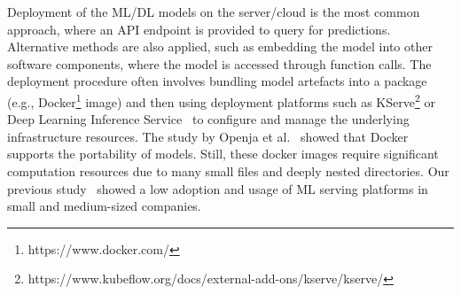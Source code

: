 
Deployment of the ML/DL models on the server/cloud is the most common approach, where an API endpoint is provided to query for predictions. Alternative methods are also applied, such as embedding the model into other software components, where the model is accessed through function calls. The deployment procedure often involves bundling model artefacts into a package (e.g., Docker\footnote{https://www.docker.com/} image) and then using deployment platforms such as KServe\footnote{https://www.kubeflow.org/docs/external-add-ons/kserve/kserve/} or Deep Learning Inference Service~\cite{soifer2019deep} to configure and manage the underlying infrastructure resources. The study by Openja et al.~\cite{openja} showed that Docker supports the portability of models. Still, these docker images require significant computation resources due to many small files and deeply nested directories. Our previous study~\cite{muiruri2022practices} showed a low adoption and usage of ML serving platforms in small and medium-sized companies.

